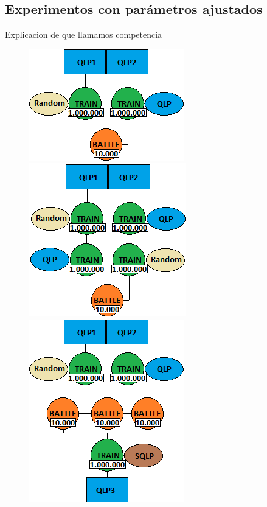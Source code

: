 \documentclass[10pt, a4paper]{article}
\begin{document}
\subsection{Experimentos con parámetros ajustados}

Explicacion de que llamamos competencia

\begin{figure}[ht]
  \begin{minipage}[c]{1\textwidth}
  \includegraphics[scale=0.7]{E1.png}
  \includegraphics[scale=0.7]{E2.png}
  \includegraphics[scale=0.7]{E3.png}
  \end{minipage}
\end{figure}
\end{document}
